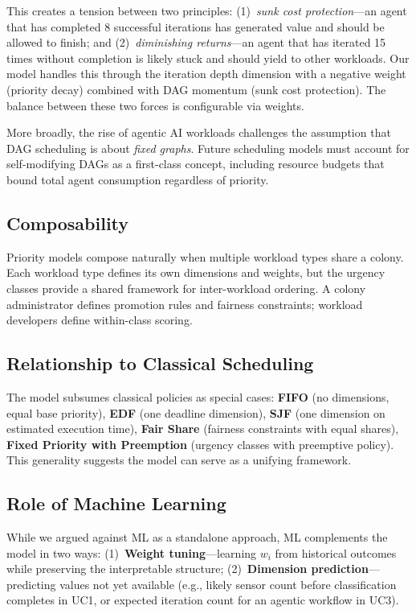 \documentclass[conference]{IEEEtran}
\begin{document}
This creates a tension between two principles: (1)~\emph{sunk cost protection}---an agent that has completed 8 successful iterations has generated value and should be allowed to finish; and (2)~\emph{diminishing returns}---an agent that has iterated 15 times without completion is likely stuck and should yield to other workloads. Our model handles this through the iteration depth dimension with a negative weight (priority decay) combined with DAG momentum (sunk cost protection). The balance between these two forces is configurable via weights.

More broadly, the rise of agentic AI workloads challenges the assumption that DAG scheduling is about \emph{fixed graphs}. Future scheduling models must account for self-modifying DAGs as a first-class concept, including resource budgets that bound total agent consumption regardless of priority.

\subsection{Composability}

Priority models compose naturally when multiple workload types share a colony. Each workload type defines its own dimensions and weights, but the urgency classes provide a shared framework for inter-workload ordering. A colony administrator defines promotion rules and fairness constraints; workload developers define within-class scoring.

\subsection{Relationship to Classical Scheduling}

The model subsumes classical policies as special cases: \textbf{FIFO} (no dimensions, equal base priority), \textbf{EDF} (one deadline dimension), \textbf{SJF} (one dimension on estimated execution time), \textbf{Fair Share} (fairness constraints with equal shares), \textbf{Fixed Priority with Preemption} (urgency classes with preemptive policy). This generality suggests the model can serve as a unifying framework.

\subsection{Role of Machine Learning}

While we argued against ML as a standalone approach, ML complements the model in two ways: (1)~\textbf{Weight tuning}---learning $w_i$ from historical outcomes while preserving the interpretable structure; (2)~\textbf{Dimension prediction}---predicting values not yet available (e.g., likely sensor count before classification completes in UC1, or expected iteration count for an agentic workflow in UC3).
\end{document}
